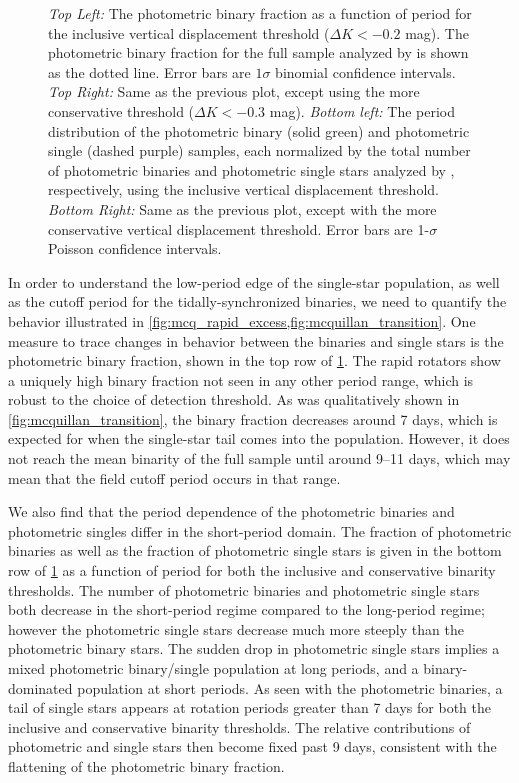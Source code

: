\documentclass[manuscript]{aastex6}
\begin{document}
\begin{figure}[htb]
    \centering
    \caption{\emph{Top Left:} The photometric binary fraction as a function of 
        period for the inclusive vertical displacement threshold (\(\Delta K <
        -0.2\) mag). The photometric binary fraction
        for the full sample analyzed by \citet{McQuillan14} is shown as the
        dotted line. Error bars are \(1 \sigma\) binomial confidence
        intervals. \emph{Top Right:} Same as the previous plot, except using
        the more conservative threshold (\(\Delta K < -0.3\) mag). \emph{Bottom
        left:} The period distribution of the photometric binary (solid green) 
        and photometric single (dashed purple) samples, each normalized by the 
        total number of photometric binaries and photometric single stars 
        analyzed by \citet{McQuillan14}, respectively, using the inclusive
        vertical displacement threshold. \emph{Bottom Right:}
        Same as the previous plot, except with the more conservative vertical
        displacement threshold. Error bars are 1-\(\sigma\) Poisson confidence 
    intervals.}\label{fig:binary_fraction}
\end{figure}

In order to understand the low-period edge of the single-star population, as
well as the cutoff period for the tidally-synchronized binaries, we need to
quantify the behavior illustrated in
\cref{fig:mcq_rapid_excess,fig:mcquillan_transition}. One measure to trace
changes in behavior between the binaries and single stars is the photometric
binary fraction, shown in the top row of \cref{fig:binary_fraction}. The rapid 
rotators show a uniquely high binary fraction not seen in any other period 
range, which is robust to the choice of detection threshold. As was 
qualitatively shown in \cref{fig:mcquillan_transition}, the binary fraction 
decreases around 7 days, which is expected for when the single-star tail comes 
into the population. However, it does not reach the mean binarity of the full 
sample until around 9--11 days, which may mean that the field cutoff period
occurs in that range.

We also find that the period dependence of the photometric binaries and
photometric singles differ in the short-period domain. The fraction of
photometric binaries as well as the fraction of
photometric single stars is given in the bottom row of
\cref{fig:binary_fraction} as a function of period for both the inclusive and 
conservative binarity thresholds. The number of photometric binaries and 
photometric single stars both decrease in the short-period regime compared to the 
long-period regime; however the photometric single stars decrease much more 
steeply than the photometric binary stars. The sudden drop in photometric 
single stars implies a mixed photometric binary/single population at long 
periods, and a binary-dominated population at short periods. As seen with the
photometric binaries, a tail of 
single stars appears at rotation periods greater than 7 days for both the 
inclusive and conservative binarity thresholds. The relative contributions of 
photometric and single stars then become fixed past 9 days, consistent with 
the flattening of the photometric binary fraction. 
\end{document}
